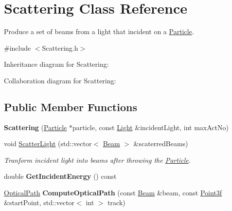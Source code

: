 \hypertarget{class_scattering}{}\section{Scattering Class Reference}
\label{class_scattering}


Produce a set of beams from a light that incident on a \mbox{\hyperlink{class_particle}{Particle}}.  




{\ttfamily \#include $<$Scattering.\+h$>$}



Inheritance diagram for Scattering\+:


Collaboration diagram for Scattering\+:
\subsection*{Public Member Functions}
\begin{DoxyCompactItemize}
\item 
\mbox{\label{class_scattering_aa7c9e78a57111fd2cbf858f1c453283f}} 
{\bfseries Scattering} (\mbox{\hyperlink{class_particle}{Particle}} $\ast$particle, const \mbox{\hyperlink{class_light}{Light}} \&incident\+Light, int max\+Act\+No)
\item 
void \mbox{\hyperlink{class_scattering_ab428bc4f6c26d02bcf7044e653cdf523}{Scatter\+Light}} (std\+::vector$<$ \mbox{\hyperlink{class_beam}{Beam}} $>$ \&scaterred\+Beams)
\begin{DoxyCompactList}\small\item\em Tranform incident light into beams after throwing the \mbox{\hyperlink{class_particle}{Particle}}. \end{DoxyCompactList}\item 
\mbox{\label{class_scattering_afb9b9c16fc45f08a0a2b1bdaa14fdb9a}} 
double {\bfseries Get\+Incident\+Energy} () const
\item 
\mbox{\label{class_scattering_ac628a914ca4f93914df8cc3e64b03636}} 
\mbox{\hyperlink{struct_optical_path}{Optical\+Path}} {\bfseries Compute\+Optical\+Path} (const \mbox{\hyperlink{class_beam}{Beam}} \&beam, const \mbox{\hyperlink{struct_point3f}{Point3f}} \&start\+Point, std\+::vector$<$ int $>$ track)
\end{DoxyCompactItemize}
